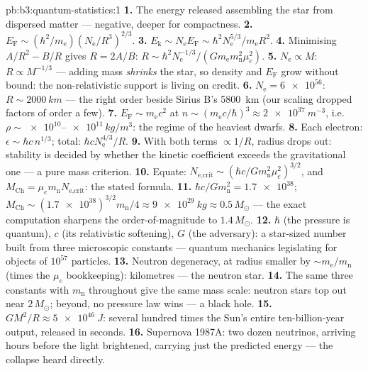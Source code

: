 \begin{solution}{pb:b3:quantum-statistics:1}
\textbf{1.} The energy released assembling the star from dispersed
matter --- negative, deeper for compactness.
\textbf{2.} $E_{\text{F}} \sim (\hbar^2/m_{\text{e}})
(N_{\text{e}}/R^3)^{2/3}$.
\textbf{3.} $E_{\text{k}} \sim N_{\text{e}}E_{\text{F}} \sim
\hbar^2N_{\text{e}}^{5/3}/m_{\text{e}}R^2$.
\textbf{4.} Minimising $A/R^2 - B/R$ gives $R = 2A/B$: $R \sim
\hbar^2N_{\text{e}}^{-1/3}/(Gm_{\text{e}}m_{\text{n}}^2\mu_e^2)$.
\textbf{5.} $N_{\text{e}} \propto M$: $R \propto M^{-1/3}$ ---
adding mass \emph{shrinks} the star, so density and $E_{\text{F}}$
grow without bound: the non-relativistic support is living on
credit.
\textbf{6.} $N_{\text{e}} = \num{6e56}$: $R \sim \qty{2000}{km}$
--- the right order beside Sirius B's \qty{5800}{km} (our scaling
dropped factors of order a few).
\textbf{7.} $E_{\text{F}} \sim m_{\text{e}}c^2$ at $n \sim
(m_{\text{e}}c/\hbar)^3 \approx \qty{2e37}{m^{-3}}$, i.e.\ $\rho
\sim \num{e10}$--$\num{e11}\,\unit{kg/m^3}$: the regime of the
heaviest dwarfs.
\textbf{8.} Each electron: $\epsilon \sim \hbar c\,n^{1/3}$;
total: $\hbar cN_{\text{e}}^{4/3}/R$.
\textbf{9.} With both terms $\propto 1/R$, radius drops out:
stability is decided by whether the kinetic coefficient exceeds
the gravitational one --- a pure mass criterion.
\textbf{10.} Equate: $N_{\text{e,crit}} \sim (\hbar c/
Gm_{\text{n}}^2\mu_e^2)^{3/2}$, and $M_{\text{Ch}} =
\mu_em_{\text{n}}N_{\text{e,crit}}$: the stated formula.
\textbf{11.} $\hbar c/Gm_{\text{n}}^2 = \num{1.7e38}$;
$M_{\text{Ch}} \sim (\num{1.7e38})^{3/2}m_{\text{n}}/4 \approx
\qty{9e29}{kg} \approx 0.5\,M_\odot$ --- the exact computation
sharpens the order-of-magnitude to $1.4\,M_\odot$.
\textbf{12.} $\hbar$ (the pressure is quantum), $c$ (its
relativistic softening), $G$ (the adversary): a star-sized number
built from three microscopic constants --- quantum mechanics
legislating for objects of $10^{57}$ particles.
\textbf{13.} Neutron degeneracy, at radius smaller by
$\sim m_{\text{e}}/m_{\text{n}}$ (times the $\mu_e$ bookkeeping):
kilometres --- the neutron star.
\textbf{14.} The same three constants with $m_{\text{n}}$
throughout give the same mass scale: neutron stars top out near
$2\,M_\odot$; beyond, no pressure law wins --- a black hole.
\textbf{15.} $GM^2/R \approx \qty{5e46}{J}$: several hundred times
the Sun's entire ten-billion-year output, released in seconds.
\textbf{16.} Supernova 1987A: two dozen neutrinos, arriving hours
before the light brightened, carrying just the predicted energy
--- the collapse heard directly.

\end{solution}
